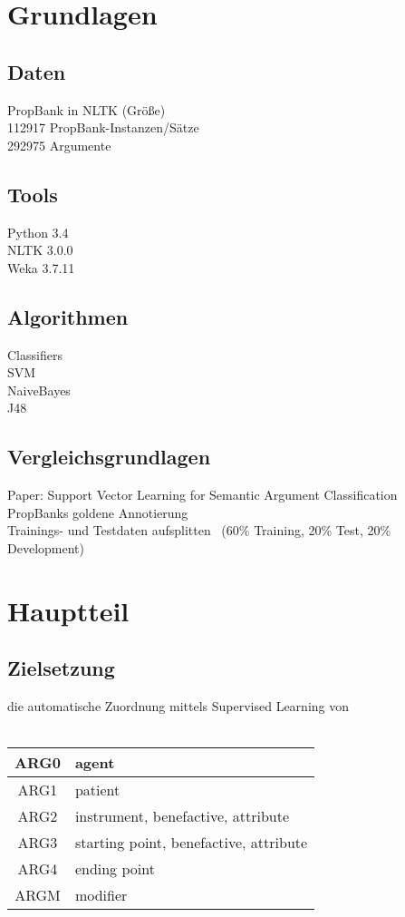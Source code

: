 \documentclass[runningheads]{llncs}
\begin{document}
\section{Grundlagen}
\subsection{Daten}
PropBank in NLTK (Gr\"o\ss{}e)\\
112917 PropBank-Instanzen/S\"atze\\
292975 Argumente
\subsection{Tools}
Python 3.4\\
NLTK 3.0.0\\
Weka 3.7.11
\subsection{Algorithmen}
Classifiers\\
SVM\\
NaiveBayes\\
J48
\subsection{Vergleichsgrundlagen}
Paper: Support Vector Learning for Semantic Argument Classiﬁcation\\
PropBanks goldene Annotierung\\
Trainings- und Testdaten aufsplitten ~(60\% Training, 20\% Test, 20\% Development) 

\section{Hauptteil}
\subsection{Zielsetzung}
die automatische Zuordnung mittels Supervised Learning von\\
\\
\begin{table}
\centering
\begin{tabular}{|c|l|}
\hline 
ARG0 & agent \\ 
\hline 
ARG1 & patient \\ 
\hline 
ARG2 & instrument, benefactive, attribute \\ 
\hline 
ARG3 & starting point, benefactive, attribute \\ 
\hline 
ARG4 & ending point \\ 
\hline 
ARGM & modifier \\ 
\hline 
\end{tabular}
\end{table}
 
\end{document}
